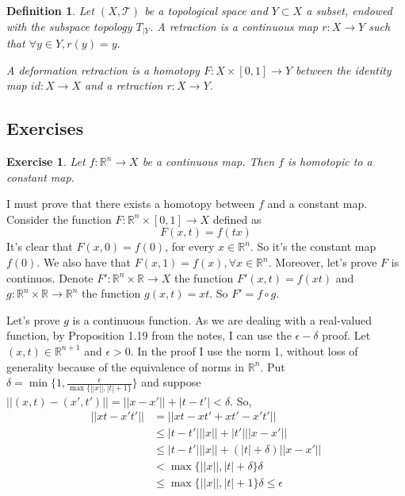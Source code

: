 \documentclass[a4paper,11pt]{article}
\theoremstyle{mytheor}
\newtheorem{definition}{Definition}[subsection]
\theoremstyle{mytheor}
\newtheorem{exercise}{Exercise}
\theoremstyle{remark}
\newcommand{\T}{\mathcal{T}}
\newcommand{\R}{\mathbb{R}}
\begin{document}
\begin{definition}
    Let $(X, \T)$ be a topological space and $Y \subset X$ a subset, endowed
    with the subspace topology $T_{|Y}$. A retraction is a continuous map $r :
    X \to Y$ such that $\forall y \in Y, r(y) = y$. 
    
    A deformation retraction is a homotopy $F : X \times [0, 1] \to Y$ between
    the identity map $id: X \to X$ and a retraction $r : X \to Y$.
\end{definition}

\subsection{Exercises}

\begin{exercise}
    Let $f : \R^n \to X$ be a continuous map. Then $f$ is homotopic to a constant map.
\end{exercise}

I must prove that there exists a homotopy between $f$ and a constant map.
Consider the function $F : \R^n \times [0,1] \to X$ defined as 
$$
F(x,t) = f(tx) 
$$
It's clear that $F(x,0) = f(0)$, for every $x \in \R^n$. So it's the constant
map $f(0)$. We also have that $F(x,1) = f(x), \forall x \in \R^n$. 
Moreover, let's prove $F$ is continuos. Denote $F' : \R^n \times \R \to X$ the
function $F'(x,t) = f(xt)$ and $g: \R^n \times \R \to \R^n$ the function
$g(x,t) = xt$. So $F' = f \circ g$. 

Let's prove $g$ is a continuous function. As we are dealing with a real-valued
function, by Proposition 1.19 from the notes, I can use the $\epsilon-\delta$
proof. Let $(x,t) \in \R^{n+1}$ and $\epsilon > 0$. In the proof I use the
norm 1, without loss of generality because of the equivalence of norms in
$\R^n$. Put $\delta = \min\{1, \frac{\epsilon}{\max\{||x||, |t| + 1\}} \}$ and suppose $||(x,t) - (x',t')|| = ||x - x'|| + |t -
t'| < \delta$. So,
\begin{equation*}
    \begin{split}
        ||xt - x't'|| &= ||xt - xt' + xt' - x't'|| \\
        &\le |t - t'|||x|| + |t'|||x - x'|| \\
        &\le |t - t'|||x|| + (|t| + \delta)||x - x'|| \\
        &< \max\{||x||, |t| + \delta\}\delta \\
        &\le \max\{||x||, |t| + 1\}\delta \le \epsilon
    \end{split}
\end{equation*} 
\end{document}
